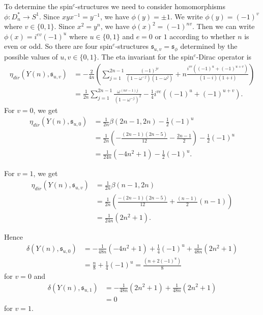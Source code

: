 \documentclass{amsart}
\theoremstyle{definition}
\theoremstyle{remark}
\numberwithin{equation}{section}
\begin{document}
To determine the spin$^c$-structures we need to consider homomorphisms $\phi : D^*_n \to S^1$. Since $xyx^{-1} = y^{-1}$, we have $\phi(y) = \pm 1$. We write $\phi(y) = (-1)^v$ where $v \in \{ 0,1\}$. Since $x^2 = y^n$, we have $\phi(x)^2 = (-1)^{nv}$. Then we can write $\phi(x) = i^{ev} (-1)^u$ where $u \in \{0,1\}$ and $e = 0$ or $1$ according to whether $n$ is even or odd. So there are four spin$^c$-structures $\mathfrak{s}_{u,v} = \mathfrak{s}_\phi$ determined by the possible values of $u,v \in \{0,1\}$. The eta invariant for the spin$^c$-Dirac operator is
\begin{align*}
\eta_{dir}( Y(n) , \mathfrak{s}_{u,v} ) &= -\frac{2}{4n}\left( \sum_{j=1}^{2n-1} \frac{ (-1)^{jv} }{(1-\omega^{-j})(1-\omega^j)} + n \frac{ i^{ve}( (-1)^u + (-1)^{u+v} )}{(1-i)(1+i)} \right) \\
&= \frac{1}{2n} \sum_{j=1}^{2n-1} \frac{ \omega^{(nv-1)j} }{(1-\omega^{-j})^2} - \frac{1}{4} i^{ve}( (-1)^u + (-1)^{u+v} ). 
\end{align*}
For $v=0$, we get
\begin{align*}
\eta_{dir}(Y(n) , \mathfrak{s}_{u,0}) &= \frac{1}{2n} \beta(2n-1,2n) - \frac{1}{2}(-1)^u \\
&= \frac{1}{2n}\left( -\frac{(2n-1)(2n-5)}{12} - \frac{2n-1}{2} \right) - \frac{1}{2}(-1)^u \\
&= \frac{1}{24n}\left( -4n^2 + 1 \right) - \frac{1}{2}(-1)^u.
\end{align*}

For $v = 1$, we get
\begin{align*}
\eta_{dir}(Y(n) , \mathfrak{s}_{u,v}) &= \frac{1}{2n} \beta(n-1,2n) \\
&= \frac{1}{2n} \left( \frac{-(2n-1)(2n-5)}{12} + \frac{(n-1)}{2}( n - 1) \right) \\
&= \frac{1}{24n} \left( 2n^2 + 1 \right). 
\end{align*}

Hence
\begin{align*}
\delta( Y(n) , \mathfrak{s}_{u,0} ) &= -\frac{1}{48n}( -4n^2 + 1) + \frac{1}{4}(-1)^u + \frac{1}{48n}(2n^2 + 1) \\
&= \frac{n}{8} + \frac{1}{4}(-1)^u = \frac{ (n+ 2(-1)^u)}{8}
\end{align*}
for $v=0$ and
\begin{align*}
\delta( Y(n) , \mathfrak{s}_{u,1}) &= -\frac{1}{48n}( 2n^2 + 1 ) + \frac{1}{48n}(2n^2 + 1) \\
&=0
\end{align*}
for $v=1$.
\end{document}
